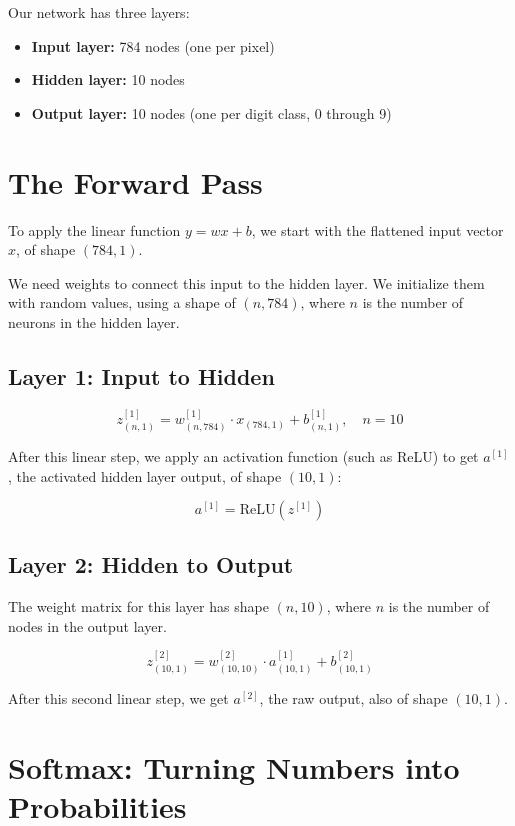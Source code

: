 \documentclass[11pt]{article}
\begin{document}
Our network has three layers:

\begin{itemize}[noitemsep]
    \item \textbf{Input layer:} 784 nodes (one per pixel)
    \item \textbf{Hidden layer:} 10 nodes
    \item \textbf{Output layer:} 10 nodes (one per digit class, 0 through 9)
\end{itemize}

\section*{The Forward Pass}

To apply the linear function $y = wx + b$, we start with the flattened input vector $x$, of shape $(784, 1)$.

We need weights to connect this input to the hidden layer. We initialize them with random values, using a shape of $(n, 784)$, where $n$ is the number of neurons in the hidden layer.

\subsection*{Layer 1: Input to Hidden}

\[
z^{[1]}_{(n,1)} = w^{[1]}_{(n,784)} \cdot x_{(784,1)} + b^{[1]}_{(n,1)}, \quad n = 10
\]

After this linear step, we apply an activation function (such as ReLU) to get $a^{[1]}$, the activated hidden layer output, of shape $(10, 1)$:

\[
a^{[1]} = \text{ReLU}(z^{[1]})
\]

\subsection*{Layer 2: Hidden to Output}

The weight matrix for this layer has shape $(n, 10)$, where $n$ is the number of nodes in the output layer.

\[
z^{[2]}_{(10,1)} = w^{[2]}_{(10,10)} \cdot a^{[1]}_{(10,1)} + b^{[2]}_{(10,1)}
\]

After this second linear step, we get $a^{[2]}$, the raw output, also of shape $(10, 1)$.

\section*{Softmax: Turning Numbers into Probabilities}
\end{document}
